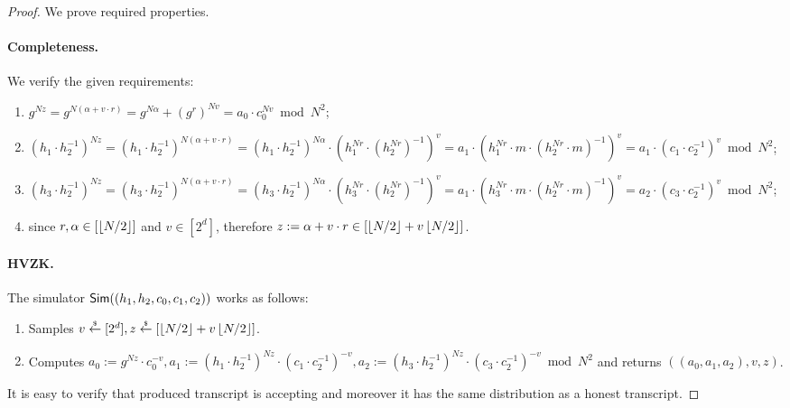 \begin{proof} 
We prove required properties. 

\paragraph{Completeness.} We verify the given requirements:
\begin{enumerate}
\item $g^{Nz} = g^{N(\alpha + v \cdot r)} = g^{N\alpha} + (g^r)^{Nv} = a_0 \cdot c_0^{Nv} \bmod N^2$;
\item $(h_1\cdot h_2^{-1})^{Nz} = (h_1\cdot h_2^{-1})^{N(\alpha + v \cdot r)} = (h_1\cdot h_2^{-1})^{N\alpha} \cdot (h_1^{Nr}\cdot (h_2^{Nr})^{-1})^v = a_1 \cdot (h_1^{Nr} \cdot m \cdot (h_2^{Nr} \cdot m)^{-1})^v = a_1 \cdot (c_1\cdot c_2^{-1})^v \bmod N^2$;
\item $(h_3\cdot h_2^{-1})^{Nz} = (h_3\cdot h_2^{-1})^{N(\alpha + v \cdot r)} = (h_3\cdot h_2^{-1})^{N\alpha} \cdot (h_3^{Nr}\cdot (h_2^{Nr})^{-1})^v = a_1 \cdot (h_3^{Nr} \cdot m \cdot (h_2^{Nr} \cdot m)^{-1})^v = a_2 \cdot (c_3\cdot c_2^{-1})^v \bmod N^2$;
\item since $r, \alpha \in [\left\lfloor N/2 \right\rfloor]$ and $v \in [2^d]$, therefore $z:= \alpha + v \cdot r \in [\left\lfloor N/2 \right\rfloor + v\left\lfloor N/2 \right\rfloor]$. 
\end{enumerate}

\paragraph{HVZK.} The simulator $\mathsf{Sim}((h_1, h_2, c_0, c_1, c_2))$ works as follows:
\begin{enumerate}
\item Samples $v \stackrel{{\scriptscriptstyle\$}}{\leftarrow} [2^d], z \stackrel{{\scriptscriptstyle\$}}{\leftarrow} [\left\lfloor N/2 \right\rfloor + v\left\lfloor N/2 \right\rfloor]$.
\item Computes $a_0:= g^{Nz} \cdot c_0^{-v}, a_1:= (h_1 \cdot h_2^{-1})^{Nz} \cdot (c_1 \cdot c_2^{-1})^{-v}, a_2:= (h_3 \cdot h_2^{-1})^{Nz} \cdot (c_3 \cdot c_2^{-1})^{-v} \bmod N^2$ and returns $((a_0, a_1, a_2), v, z)$.
\end{enumerate}
It is easy to verify that produced transcript is accepting and moreover it has the same distribution as a honest transcript. 



\end{proof}
